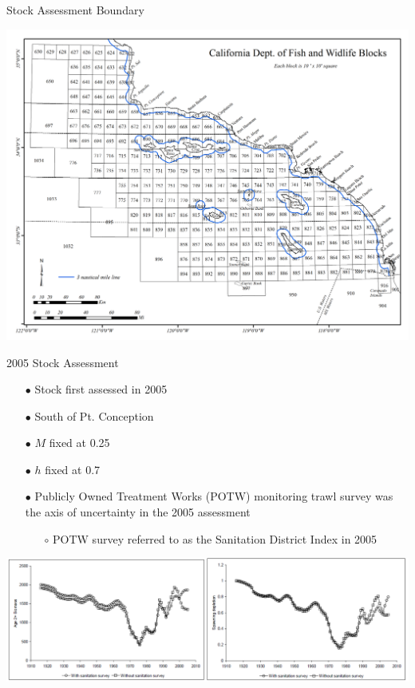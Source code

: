 \documentclass[ignorenonframetext,compress]{beamer}
\begin{document}
\begin{frame}{Stock Assessment Boundary}

\centering
\includegraphics{Figures/assess_region_map.png}

\end{frame}

\begin{frame}{2005 Stock Assessment}

\begin{itemize}
\item[$\bullet$] Stock first assessed in 2005
\item[$\bullet$] South of Pt. Conception
\item[$\bullet$] $M$ fixed at 0.25
\item[$\bullet$] $h$ fixed at 0.7
\item[$\bullet$] Publicly Owned Treatment Works (POTW) monitoring trawl survey was the axis of uncertainty in the 2005 assessment
\begin{itemize}
\item[$\circ$] POTW survey referred to as the Sanitation District Index in 2005
\end{itemize}
\end{itemize}

\includegraphics{Figures/2005_bio_depl.png}

\end{frame}
\end{document}
